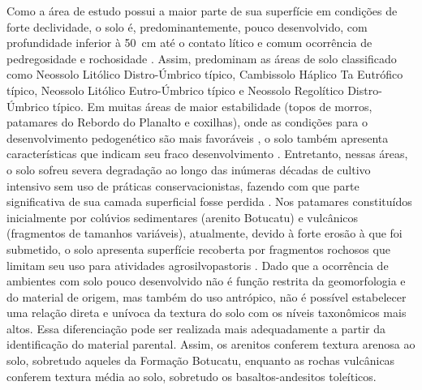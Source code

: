 
Como a área de estudo possui a maior parte de sua superfície em condições de forte declividade, o solo é, 
predominantemente, pouco desenvolvido, com profundidade inferior à \SI{50}{\cm} até o contato lítico e comum 
ocorrência de pedregosidade e rochosidade \cite{Miguel2010}. Assim, predominam as áreas de solo classificado 
como Neossolo Litólico Distro-Úmbrico típico, Cambissolo Háplico Ta Eutrófico típico, Neossolo Litólico 
Eutro-Úmbrico típico e Neossolo Regolítico Distro-Úmbrico típico. Em muitas áreas de maior estabilidade (topos 
de morros, patamares do Rebordo do Planalto e coxilhas), onde as condições para o desenvolvimento pedogenético 
são mais favoráveis \cite{Moser1990}, o solo também apresenta características que indicam seu fraco 
desenvolvimento \cite{MouraBueno2012}. Entretanto, nessas áreas, o solo sofreu severa degradação ao longo das 
inúmeras décadas de cultivo intensivo sem uso de práticas conservacionistas, fazendo com que parte 
significativa de sua camada superficial fosse perdida \cite{SamuelRosaEtAl2011a}. Nos patamares constituídos 
inicialmente por colúvios sedimentares (arenito Botucatu) e vulcânicos (fragmentos de tamanhos variáveis), 
atualmente, devido à forte erosão à que foi submetido, o solo apresenta superfície recoberta por fragmentos 
rochosos que limitam seu uso para atividades agrosilvopastoris \cite{MouraBueno2012}. Dado que a ocorrência de 
ambientes com solo pouco desenvolvido não é função restrita da geomorfologia e do material de origem, mas 
também do uso antrópico, não é possível estabelecer uma relação direta e unívoca da textura do solo com os 
níveis taxonômicos mais altos. Essa diferenciação pode ser realizada mais adequadamente a partir da 
identificação do material parental. Assim, os arenitos conferem textura arenosa ao solo, sobretudo aqueles da 
Formação Botucatu, enquanto as rochas vulcânicas conferem textura média ao solo, sobretudo os 
basaltos-andesitos toleíticos.

